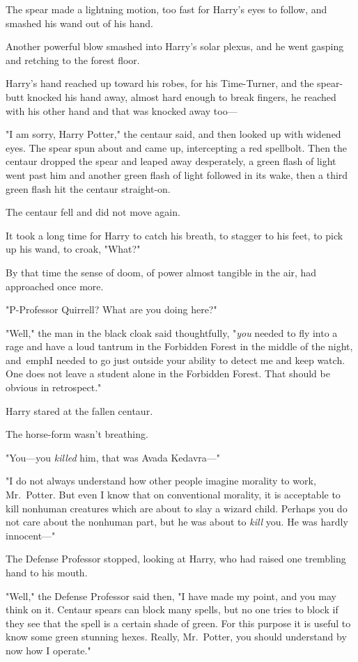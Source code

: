 The spear made a lightning motion, too fast for Harry's eyes to follow, and 
smashed his wand out of his hand.

Another powerful blow smashed into Harry's solar plexus, and he went gasping 
and retching to the forest floor.

Harry's hand reached up toward his robes, for his Time-Turner, and the 
spear-butt knocked his hand away, almost hard enough to break fingers, he 
reached with his other hand and that was knocked away too---

"I am sorry, Harry Potter," the centaur said, and then looked up with widened 
eyes. The spear spun about and came up, intercepting a red spellbolt. Then the 
centaur dropped the spear and leaped away desperately, a green flash of light 
went past him and another green flash of light followed in its wake, then a 
third green flash hit the centaur straight-on.

The centaur fell and did not move again.

It took a long time for Harry to catch his breath, to stagger to his feet, to 
pick up his wand, to croak, "What?"

By that time the sense of doom, of power almost tangible in the air, had 
approached once more.

"P-Professor Quirrell? What are you doing here?"

"Well," the man in the black cloak said thoughtfully, "\emph{you} needed to fly 
into a rage and have a loud tantrum in the Forbidden Forest in the middle of 
the night, and\ emph{I} needed to go just outside your ability to detect me and 
keep watch. One does not leave a student alone in the Forbidden Forest. That 
should be obvious in retrospect."

Harry stared at the fallen centaur.

The horse-form wasn't breathing.

"You---you \emph{killed} him, that was Avada Kedavra---"

"I do not always understand how other people imagine morality to work, 
Mr.~Potter. But even I know that on conventional morality, it is acceptable to 
kill nonhuman creatures which are about to slay a wizard child. Perhaps you do 
not care about the nonhuman part, but he was about to \emph{kill} you. He was 
hardly innocent---"

The Defense Professor stopped, looking at Harry, who had raised one trembling 
hand to his mouth.

"Well," the Defense Professor said then, "I have made my point, and you may 
think on it. Centaur spears can block many spells, but no one tries to block if 
they see that the spell is a certain shade of green. For this purpose it is 
useful to know some green stunning hexes. Really, Mr.~Potter, you should 
understand by now how I operate."

